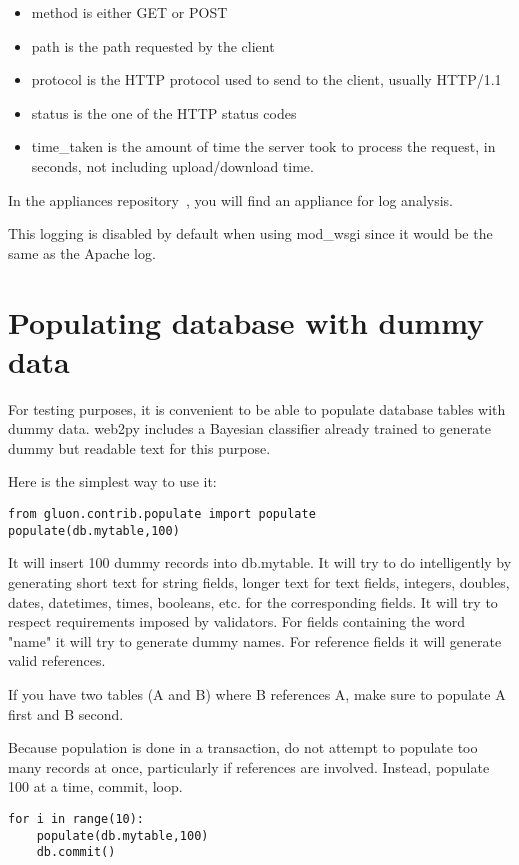\documentclass[justified,sixbynine,notoc]{tufte-book}
\begin{document}
\begin{fullwidth}
\begin{itemize}
\item method is either GET or POST

\item path is the path requested by the client

\item protocol is the HTTP protocol used to send to the client, usually HTTP/1.1

\item status is the one of the HTTP status codes~\cite{status}

\item time\_taken is the amount of time the server took to process the request, in seconds, not including upload/download time.
\end{itemize}

In the appliances repository~\cite{appliances}, you will find an appliance for log analysis.

This logging is disabled by default when using mod\_wsgi since it would be the same as the Apache log.

\goodbreak\section{Populating database with dummy data}

For testing purposes, it is convenient to be able to populate database tables with dummy data. web2py includes a Bayesian classifier already trained to generate dummy but readable text for this purpose.

Here is the simplest way to use it:
\begin{lstlisting}
from gluon.contrib.populate import populate
populate(db.mytable,100)
\end{lstlisting}

It will insert 100 dummy records into db.mytable. It will try to do intelligently by generating short text for string fields, longer text for text fields, integers, doubles, dates, datetimes, times, booleans, etc. for the corresponding fields. It will try to respect requirements imposed by validators. For fields containing the word "name" it will try to generate dummy names. For reference fields it will generate valid references.

If you have two tables (A and B) where B references A, make sure to populate A first and B second.

Because population is done in a transaction, do not attempt to populate too many records at once, particularly if references are involved. Instead, populate 100 at a time, commit, loop.
\begin{lstlisting}
for i in range(10):
    populate(db.mytable,100)
    db.commit()
\end{lstlisting}


\end{fullwidth}
\end{document}
